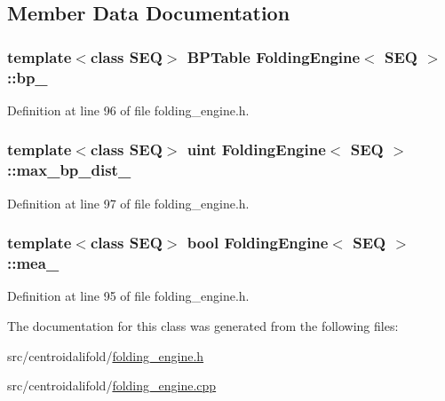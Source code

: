 \subsection{Member Data Documentation}
\hypertarget{class_folding_engine_a9b9bda82bd46da0a8a41e22be459e559}{
\subsubsection[{bp\+\_\+}]{\setlength{\rightskip}{0pt plus 5cm}template$<$class S\+E\+Q$>$ {\bf B\+P\+Table} {\bf Folding\+Engine}$<$ S\+E\+Q $>$\+::bp\+\_\+\hspace{0.3cm}{\ttfamily [protected]}}}\label{class_folding_engine_a9b9bda82bd46da0a8a41e22be459e559}


Definition at line 96 of file folding\+\_\+engine.\+h.

\hypertarget{class_folding_engine_a9f810b5b55a05965f5421b201185e5fa}{
\subsubsection[{max\+\_\+bp\+\_\+dist\+\_\+}]{\setlength{\rightskip}{0pt plus 5cm}template$<$class S\+E\+Q$>$ {\bf uint} {\bf Folding\+Engine}$<$ S\+E\+Q $>$\+::max\+\_\+bp\+\_\+dist\+\_\+\hspace{0.3cm}{\ttfamily [protected]}}}\label{class_folding_engine_a9f810b5b55a05965f5421b201185e5fa}


Definition at line 97 of file folding\+\_\+engine.\+h.

\hypertarget{class_folding_engine_a73c7910614a8894d3334dbebd1fe1b35}{
\subsubsection[{mea\+\_\+}]{\setlength{\rightskip}{0pt plus 5cm}template$<$class S\+E\+Q$>$ bool {\bf Folding\+Engine}$<$ S\+E\+Q $>$\+::mea\+\_\+\hspace{0.3cm}{\ttfamily [protected]}}}\label{class_folding_engine_a73c7910614a8894d3334dbebd1fe1b35}


Definition at line 95 of file folding\+\_\+engine.\+h.



The documentation for this class was generated from the following files\+:\begin{DoxyCompactItemize}
\item 
src/centroidalifold/\hyperlink{folding__engine_8h}{folding\+\_\+engine.\+h}\item 
src/centroidalifold/\hyperlink{folding__engine_8cpp}{folding\+\_\+engine.\+cpp}\end{DoxyCompactItemize}
